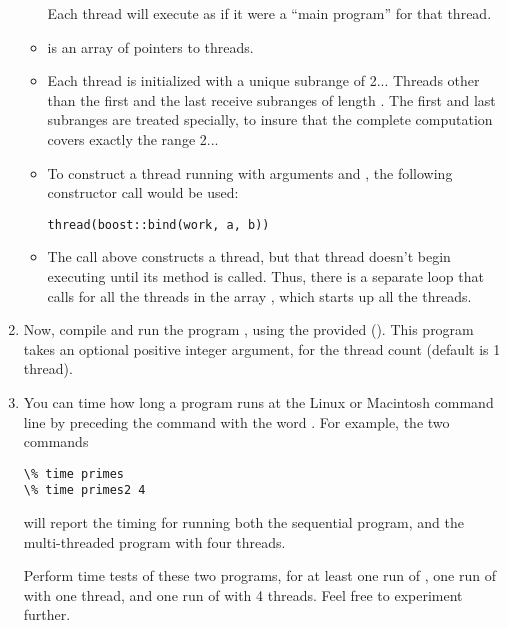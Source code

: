 \documentclass[letterpaper,10pt,openany,oneside]{sphinxmanual}
\begin{document}
\begin{enumerate}
\begin{itemize}
Each thread will execute  as if it were a ``main program''
for that thread.

\item {} 
 is an array of pointers to  threads.

\item {} 
Each  thread is initialized with a unique subrange of
2... Threads other than the first and the last receive
subranges of length . The first and last subranges are
treated specially, to insure that the complete computation covers
exactly the range 2...

\item {} 
To construct a  thread running  with arguments
 and , the following constructor call would be used:

\begin{Verbatim}[commandchars=\\\{\}]
thread(boost::bind(work, a, b))
\end{Verbatim}

\item {} 
The call above constructs a thread, but that thread doesn't begin
executing until its  method is called. Thus, there is a
separate loop that calls  for all the threads in the
array , which starts up all the threads.

\end{itemize}

\item {} 
Now, compile and run the program , using the
 provided (). This program takes an
optional positive integer argument, for the thread count (default is
1 thread).

\item {} 
You can time how long a program runs at the Linux or Macintosh
command line by preceding the command with the word . For
example, the two commands

\begin{Verbatim}[commandchars=\\\{\}]
\% time primes
\% time primes2 4
\end{Verbatim}

will report the timing for running both the sequential 
program, and the multi-threaded  program with four
threads.

Perform time tests of these two programs, for at least one run of
, one run of  with one thread, and one run of
 with 4 threads. Feel free to experiment further.


\end{enumerate}
\end{document}
